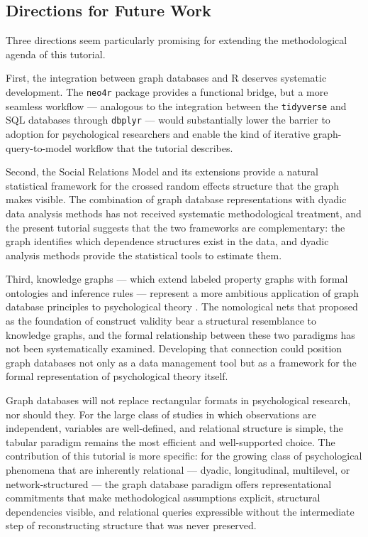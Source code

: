 \documentclass[sn-apa,pdflatex]{sn-jnl}
\theoremstyle{remark}
\theoremstyle{definition}
\begin{document}
\subsection{Directions for Future
Work}\label{directions-for-future-work}

Three directions seem particularly promising for extending the
methodological agenda of this tutorial.

First, the integration between graph databases and R deserves systematic
development. The \texttt{neo4r} package \citep{Fay2019} provides a
functional bridge, but a more seamless workflow --- analogous to the
integration between the \texttt{tidyverse} and SQL databases through
\texttt{dbplyr} --- would substantially lower the barrier to adoption
for psychological researchers and enable the kind of iterative
graph-query-to-model workflow that the tutorial describes.

Second, the Social Relations Model \citep{Kenny2006} and its extensions
provide a natural statistical framework for the crossed random effects
structure that the graph makes visible. The combination of graph
database representations with dyadic data analysis methods has not
received systematic methodological treatment, and the present tutorial
suggests that the two frameworks are complementary: the graph identifies
which dependence structures exist in the data, and dyadic analysis
methods provide the statistical tools to estimate them.

Third, knowledge graphs --- which extend labeled property graphs with
formal ontologies and inference rules --- represent a more ambitious
application of graph database principles to psychological theory
\citep{Barrasa2023}. The nomological nets that \citet{cronbach1955}
proposed as the foundation of construct validity bear a structural
resemblance to knowledge graphs, and the formal relationship between
these two paradigms has not been systematically examined. Developing
that connection could position graph databases not only as a data
management tool but as a framework for the formal representation of
psychological theory itself.

Graph databases will not replace rectangular formats in psychological
research, nor should they. For the large class of studies in which
observations are independent, variables are well-defined, and relational
structure is simple, the tabular paradigm remains the most efficient and
well-supported choice. The contribution of this tutorial is more
specific: for the growing class of psychological phenomena that are
inherently relational --- dyadic, longitudinal, multilevel, or
network-structured --- the graph database paradigm offers
representational commitments that make methodological assumptions
explicit, structural dependencies visible, and relational queries
expressible without the intermediate step of reconstructing structure
that was never preserved.

\backmatter


\end{document}

